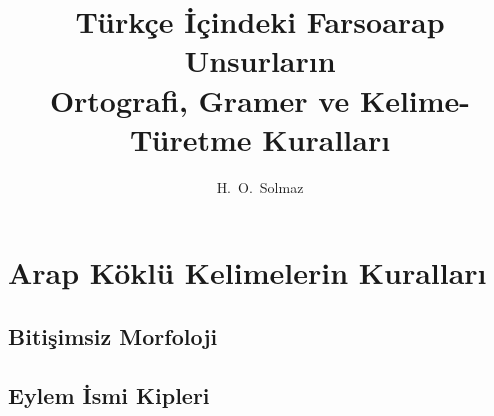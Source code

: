 \documentclass[a5paper,10pt, twoside]{scrbook}
\title{\LARGE\sffamily Türkçe İçindeki Farsoarap Unsurların \\
  Ortografi, Gramer ve Kelime-Türetme Kuralları}
\author{H.\ O.\ Solmaz}
\date{}
\begin{document}
\maketitle
\tableofcontents





\chapter{Arap Köklü Kelimelerin Kuralları}
\section{Bitişimsiz Morfoloji}

\section{Eylem İsmi Kipleri}
\end{document}
